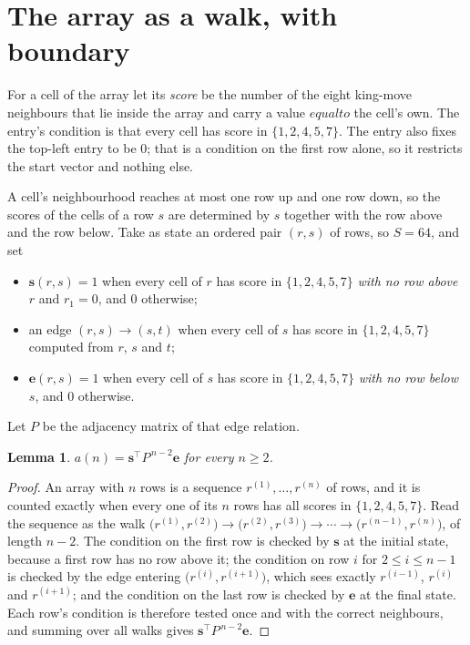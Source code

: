 \documentclass[11pt,a4paper]{article}
\theoremstyle{plain}
\newtheorem{lemma}[theorem]{Lemma}
\theoremstyle{definition}
\begin{document}
\section{The array as a walk, with boundary}

For a cell of the array let its \emph{score} be the number of the eight king-move neighbours that lie inside
the array and carry a value $equal to$ the cell's own. The entry's condition is that every cell
has score in $\{1,2,4,5,7\}$. The entry also fixes the top-left entry to be $0$; that is a condition on the first row alone, so it restricts the start vector and nothing else.

A cell's neighbourhood reaches at most one row up and one row down, so the scores of the
cells of a row $s$ are determined by $s$ together with the row above and the row below.
Take as state an ordered pair $(r,s)$ of rows, so $S=64$, and set
\begin{itemize}
\item $\mathbf{s}(r,s)=1$ when every cell of $r$ has score in $\{1,2,4,5,7\}$ \emph{with no row
above $r$} and $r_1=0$, and $0$ otherwise;
\item an edge $(r,s)\to(s,t)$ when every cell of $s$ has score in $\{1,2,4,5,7\}$ computed from
$r$, $s$ and $t$;
\item $\mathbf{e}(r,s)=1$ when every cell of $s$ has score in $\{1,2,4,5,7\}$ \emph{with no row
below $s$}, and $0$ otherwise.
\end{itemize}
Let $P$ be the adjacency matrix of that edge relation.

\begin{lemma}\label{lem:walk}
$a(n)=\mathbf{s}^{\!\top}P^{\,n-2}\mathbf{e}$ for every $n\ge2$.
\end{lemma}

\begin{proof}
An array with $n$ rows is a sequence $r^{(1)},\dots,r^{(n)}$ of rows, and it is counted
exactly when every one of its $n$ rows has all scores in $\{1,2,4,5,7\}$. Read the sequence as the
walk $\bigl(r^{(1)},r^{(2)}\bigr)\to\bigl(r^{(2)},r^{(3)}\bigr)\to\cdots\to
\bigl(r^{(n-1)},r^{(n)}\bigr)$, of length $n-2$. The condition on the first row is
checked by $\mathbf{s}$ at the initial state, because a first row has no row above it; the
condition on row $i$ for $2\le i\le n-1$ is checked by the edge entering
$\bigl(r^{(i)},r^{(i+1)}\bigr)$, which sees exactly $r^{(i-1)}$, $r^{(i)}$ and
$r^{(i+1)}$; and the condition on the last row is checked by $\mathbf{e}$ at the final
state. Each row's condition is therefore tested once and with the correct neighbours, and
summing over all walks gives $\mathbf{s}^{\!\top}P^{\,n-2}\mathbf{e}$.
\end{proof}
\end{document}
